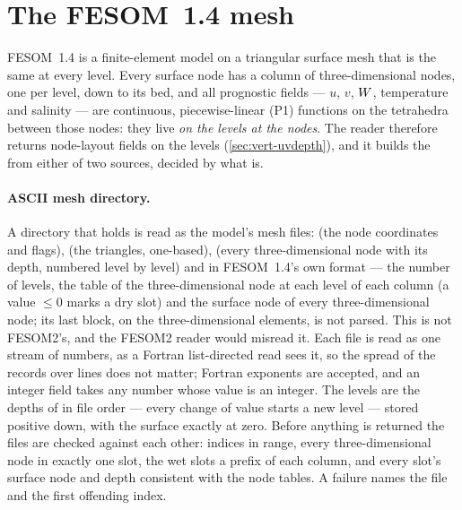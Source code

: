 
\section{The FESOM~1.4 mesh}\label{sec:mesh-fesom14}

FESOM~1.4 \citep{wang2014fesom14} is a finite-element model on a triangular surface mesh that is the same
at every level. Every surface node has a column of three-dimensional nodes, one per level, down to its
bed, and all prognostic fields --- $u$, $v$, $W$, temperature and salinity --- are continuous,
piecewise-linear (P1) functions on the tetrahedra between those nodes: they live \emph{on the levels at the
nodes}. The reader therefore returns node-layout fields on the levels (\cref{sec:vert-uvdepth}), and it
builds the  from either of two sources, decided by what  is.

\paragraph{ASCII mesh directory.} A directory that holds  is read as the model's mesh
files:  (the node coordinates and flags),  (the triangles, one-based),
 (every three-dimensional node with its depth, numbered level by level) and
 in FESOM~1.4's own format --- the number of levels, the table of the three-dimensional
node at each level of each column (a value $\le0$ marks a dry slot) and the surface node of every
three-dimensional node; its last block, on the three-dimensional elements, is not parsed. This
 is not FESOM2's, and the FESOM2 reader would misread it. Each file is read as one stream
of numbers, as a Fortran list-directed read sees it, so the spread of the records over lines does not
matter; Fortran  exponents are accepted, and an integer field takes any number whose value is an
integer. The levels are the depths of  in file order --- every change of value starts a new
level --- stored positive down, with the surface exactly at zero. Before anything is returned the files
are checked against each other: indices in range, every three-dimensional node in exactly one slot, the
wet slots a prefix of each column, and every slot's surface node and depth consistent with the node
tables. A failure names the file and the first offending index.

